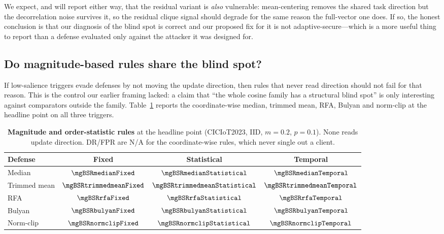 We expect, and will report either way, that the residual variant is \emph{also}
vulnerable: mean-centering removes the shared task direction but the decorrelation
noise survives it, so the residual clique signal should degrade for the same
reason the full-vector one does. If so, the honest conclusion is that our
diagnosis of the blind spot is correct and our proposed fix for it is not
adaptive-secure---which is a more useful thing to report than a defense evaluated
only against the attacker it was designed for.

\subsection{Do magnitude-based rules share the blind spot?}
\label{sec:magnitude}

If low-salience triggers evade defenses by not moving the update direction, then
rules that never read direction should not fail for that reason. This is the
control our earlier framing lacked: a claim that ``the whole cosine family has a
structural blind spot'' is only interesting against comparators outside the
family. Table~\ref{tab:magnitude} reports the coordinate-wise median, trimmed
mean, RFA, Bulyan and norm-clip at the headline point on all three triggers.
\PENDING

\begin{table}[t]
\caption{\textbf{Magnitude and order-statistic rules} at the headline point
(CICIoT2023, IID, $m{=}0.2$, $p{=}0.1$). None reads update direction. DR/FPR are
N/A for the coordinate-wise rules, which never single out a client. \PENDING}
\label{tab:magnitude}
\centering
\footnotesize
\begin{tabular}{@{}lccc@{}}
\toprule
Defense & Fixed & Statistical & Temporal \\
\midrule
Median        & $\mgBSRmedianFixed$ & $\mgBSRmedianStatistical$ & $\mgBSRmedianTemporal$ \\
Trimmed mean  & $\mgBSRtrimmedmeanFixed$ & $\mgBSRtrimmedmeanStatistical$ & $\mgBSRtrimmedmeanTemporal$ \\
RFA           & $\mgBSRrfaFixed$ & $\mgBSRrfaStatistical$ & $\mgBSRrfaTemporal$ \\
Bulyan        & $\mgBSRbulyanFixed$ & $\mgBSRbulyanStatistical$ & $\mgBSRbulyanTemporal$ \\
Norm-clip     & $\mgBSRnormclipFixed$ & $\mgBSRnormclipStatistical$ & $\mgBSRnormclipTemporal$ \\
\bottomrule
\end{tabular}
\end{table}


